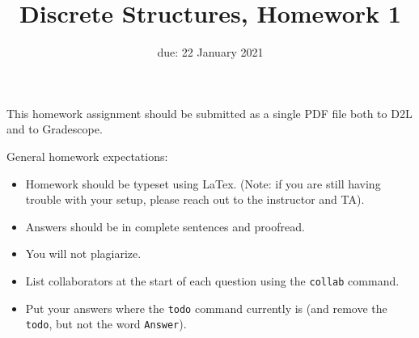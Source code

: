 \documentclass{article}
\title{Discrete Structures, Homework 1}
\author{\todo{Your Name Here}}
\date{due: 22 January 2021}
\begin{document}
\maketitle

This homework assignment should be
submitted as a single PDF file both to D2L and to Gradescope.

General homework expectations:
\begin{itemize}
    \item Homework should be typeset using LaTex.  (Note: if you are still
        having trouble with your setup, please reach out to the instructor and
        TA).
    \item Answers should be in complete sentences and proofread.
    \item You will not plagiarize.
    \item List collaborators at the start of each question using the
        \texttt{collab} command.
    \item Put your answers where the \texttt{todo} command currently is (and
        remove the \texttt{todo}, but not the word \texttt{Answer}).
\end{itemize}

\end{document}
